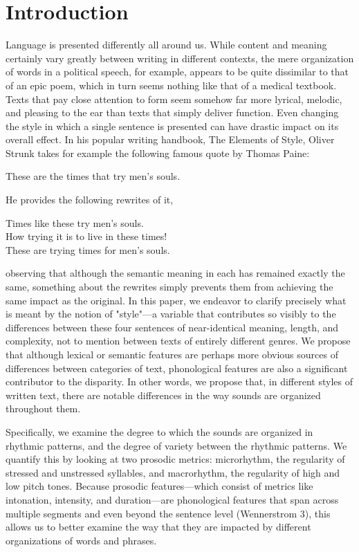 \documentclass[pageno]{jpaper}
\begin{document}
\section{Introduction}
Language is presented differently all around us. While content and meaning certainly vary greatly between writing in different contexts, the mere organization of words in a political speech, for example, appears to be quite dissimilar to that of an epic poem, which in turn seems nothing like that of a medical textbook. Texts that pay close attention to form seem somehow far more lyrical, melodic, and pleasing to the ear than texts that simply deliver function. Even changing the style in which a single sentence is presented can have drastic impact on its overall effect. In his popular writing handbook, The Elements of Style, Oliver Strunk takes for example the following famous quote by Thomas Paine: 
\begin{center}
These are the times that try men's souls.
\end{center}
He provides the following rewrites of it,
\begin{center}
Times like these try men's souls.\\
How trying it is to live in these times!\\
These are trying times for men's souls.
\end{center}
observing that although the semantic meaning in each has remained exactly the same, something about the rewrites simply prevents them from achieving the same impact as the original. In this paper, we endeavor to clarify precisely what is meant by the notion of "style"---a variable that contributes so visibly to the differences between these four sentences of near-identical meaning, length, and complexity, not to mention between texts of entirely different genres. We propose that although lexical or semantic features are perhaps more obvious sources of differences between categories of text, phonological features are also a significant contributor to the disparity. In other words, we propose that, in different styles of written text, there are notable differences in the way sounds are organized throughout them. 

Specifically, we examine the degree to which the sounds are organized in rhythmic patterns, and the degree of variety between the rhythmic patterns. We quantify this by looking at two prosodic metrics: microrhythm, the regularity of stressed and unstressed syllables, and macrorhythm, the regularity of high and low pitch tones. Because prosodic features---which consist of metrics like intonation, intensity, and duration---are phonological features that span across multiple segments and even beyond the sentence level (Wennerstrom 3), this allows us to better examine the way that they are impacted by different organizations of words and phrases. 
\end{document}
